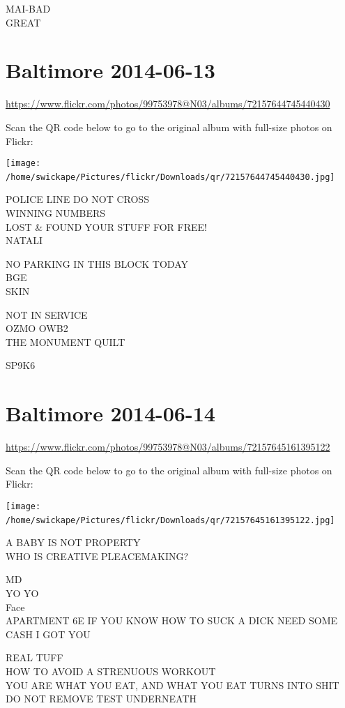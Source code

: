 \documentclass[10pt,letterpaper]{article}
\begin{document}
MAI{-}BAD\\
GREAT
\

\section*{Baltimore 2014-06-13}

\url{https://www.flickr.com/photos/99753978@N03/albums/72157644745440430}

Scan the QR code below to go to the original album with full-size photos on Flickr:

\texttt{[image: /home/swickape/Pictures/flickr/Downloads/qr/72157644745440430.jpg]}
\

POLICE LINE DO NOT CROSS\\
WINNING NUMBERS\\
LOST \& FOUND YOUR STUFF FOR FREE!\\
NATALI

NO PARKING IN THIS BLOCK TODAY\\
BGE\\
SKIN

NOT IN SERVICE\\
OZMO OWB2\\
THE MONUMENT QUILT

SP9K6
\

\section*{Baltimore 2014-06-14}

\url{https://www.flickr.com/photos/99753978@N03/albums/72157645161395122}

Scan the QR code below to go to the original album with full-size photos on Flickr:

\texttt{[image: /home/swickape/Pictures/flickr/Downloads/qr/72157645161395122.jpg]}
\

A BABY IS NOT PROPERTY\\
WHO IS CREATIVE PLEACEMAKING?

MD\\
YO YO\\
Face\\
APARTMENT 6E IF YOU KNOW HOW TO SUCK A DICK NEED SOME CASH I GOT YOU

REAL TUFF\\
HOW TO AVOID A STRENUOUS WORKOUT\\
YOU ARE WHAT YOU EAT, AND WHAT YOU EAT TURNS INTO SHIT\\
DO NOT REMOVE TEST UNDERNEATH
\end{document}
